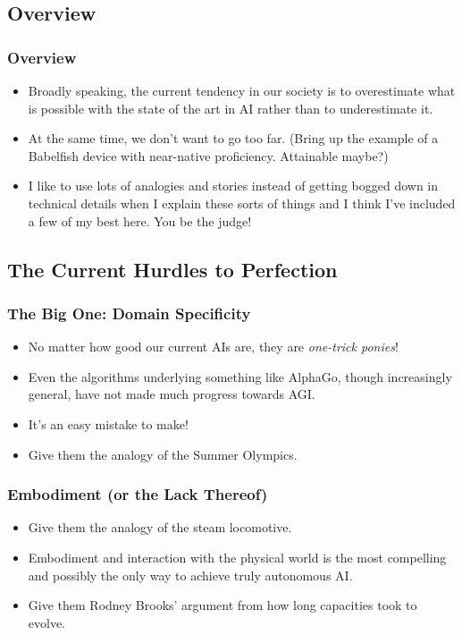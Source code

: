 \documentclass[10pt]{beamer}
\begin{document}
  \subsection{Overview}

  \begin{frame}
    \frametitle{Overview}

    \begin{itemize}
      \item Broadly speaking, the current tendency in our society is to
        overestimate what is possible with the state of the art in AI rather
        than to underestimate it.
      \pause
      \item At the same time, we don't want to go too far. (Bring up the
        example of a Babelfish device with near-native proficiency.
        Attainable maybe?)
      \pause
      \item I like to use lots of analogies and stories instead of getting
        bogged down in technical details when I explain these sorts of things
        and I think I've included a few of my best here. You be the judge!
    \end{itemize}
  \end{frame}

  \subsection{The Current Hurdles to Perfection}

  \begin{frame}
    \frametitle{The Big One: Domain Specificity}

    \begin{itemize}
      \item No matter how good our current AIs are, they are \emph{one-trick
        ponies}!
      \pause
      \item Even the algorithms underlying something like AlphaGo, though
        increasingly general, have not made much progress towards AGI.
      \pause
      \item It's an easy mistake to make!
      \pause
      \item Give them the analogy of the Summer Olympics.
    \end{itemize}
  \end{frame}

  \begin{frame}
    \frametitle{Embodiment (or the Lack Thereof)}

    \begin{itemize}
      \item Give them the analogy of the steam locomotive.
      \pause
      \item Embodiment and interaction with the physical world is the most
        compelling and possibly the only way to achieve truly autonomous AI.
      \pause
      \item Give them Rodney Brooks' argument from how long capacities took to
        evolve.
    \end{itemize}
  \end{frame}
\end{document}

